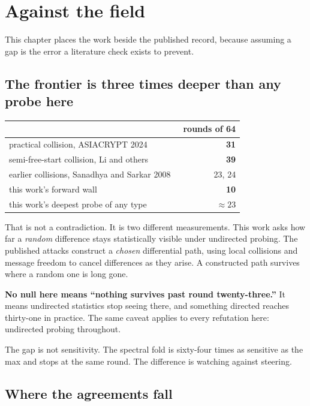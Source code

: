 \chapter{Against the field}

This chapter places the work beside the published record, because assuming a gap is the error a literature check exists to prevent.

\section{The frontier is three times deeper than any probe here}

\begin{center}
\begin{tabular}{lr}
\toprule
 & rounds of 64 \\
\midrule
practical collision, ASIACRYPT 2024~\cite{src:Li-Liu-Wang-Dong-and-Sun-2024} & \textbf{31} \\
semi-free-start collision, Li and others~\cite{src:Li-Liu-and-Wang-2024} & \textbf{39} \\
earlier collisions, Sanadhya and Sarkar 2008~\cite{src:Sanadhya-and-Sarkar-2008} & 23, 24 \\
this work's forward wall & \textbf{10} \\
this work's deepest probe of any type & \(\approx 23\) \\
\bottomrule
\end{tabular}
\end{center}

That is not a contradiction. It is two different measurements. This work asks how far a \emph{random} difference stays statistically visible under undirected probing. The published attacks construct a \emph{chosen} differential path, using local collisions and message freedom to cancel differences as they arise. A constructed path survives where a random one is long gone.

\textbf{No null here means ``nothing survives past round twenty-three.''} It means undirected statistics stop seeing there, and something directed reaches thirty-one in practice. The same caveat applies to every refutation here: undirected probing throughout.

The gap is not sensitivity. The spectral fold is sixty-four times as sensitive as the max and stops at the same round. The difference is watching against steering.

\section{Where the agreements fall}

